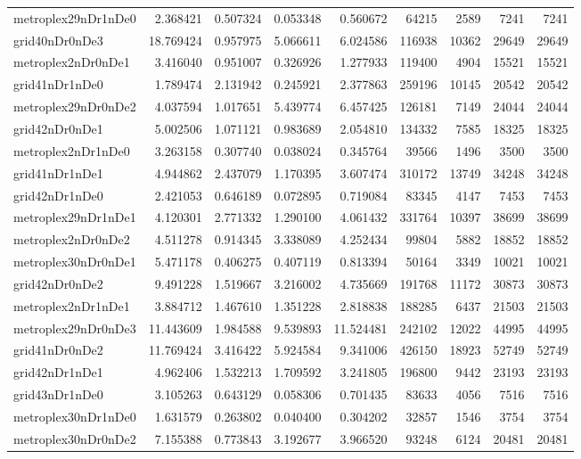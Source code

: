 \begin{longtable}{|l|r|r|r|r|r|r|r|r|}
metroplex29nDr1nDe0 & 2.368421 & 0.507324 & 0.053348 & 0.560672 & 64215 & 2589 & 7241 & 7241 \\
grid40nDr0nDe3 & 18.769424 & 0.957975 & 5.066611 & 6.024586 & 116938 & 10362 & 29649 & 29649 \\
metroplex2nDr0nDe1 & 3.416040 & 0.951007 & 0.326926 & 1.277933 & 119400 & 4904 & 15521 & 15521 \\
grid41nDr1nDe0 & 1.789474 & 2.131942 & 0.245921 & 2.377863 & 259196 & 10145 & 20542 & 20542 \\
metroplex29nDr0nDe2 & 4.037594 & 1.017651 & 5.439774 & 6.457425 & 126181 & 7149 & 24044 & 24044 \\
grid42nDr0nDe1 & 5.002506 & 1.071121 & 0.983689 & 2.054810 & 134332 & 7585 & 18325 & 18325 \\
metroplex2nDr1nDe0 & 3.263158 & 0.307740 & 0.038024 & 0.345764 & 39566 & 1496 & 3500 & 3500 \\
grid41nDr1nDe1 & 4.944862 & 2.437079 & 1.170395 & 3.607474 & 310172 & 13749 & 34248 & 34248 \\
grid42nDr1nDe0 & 2.421053 & 0.646189 & 0.072895 & 0.719084 & 83345 & 4147 & 7453 & 7453 \\
metroplex29nDr1nDe1 & 4.120301 & 2.771332 & 1.290100 & 4.061432 & 331764 & 10397 & 38699 & 38699 \\
metroplex2nDr0nDe2 & 4.511278 & 0.914345 & 3.338089 & 4.252434 & 99804 & 5882 & 18852 & 18852 \\
metroplex30nDr0nDe1 & 5.471178 & 0.406275 & 0.407119 & 0.813394 & 50164 & 3349 & 10021 & 10021 \\
grid42nDr0nDe2 & 9.491228 & 1.519667 & 3.216002 & 4.735669 & 191768 & 11172 & 30873 & 30873 \\
metroplex2nDr1nDe1 & 3.884712 & 1.467610 & 1.351228 & 2.818838 & 188285 & 6437 & 21503 & 21503 \\
metroplex29nDr0nDe3 & 11.443609 & 1.984588 & 9.539893 & 11.524481 & 242102 & 12022 & 44995 & 44995 \\
grid41nDr0nDe2 & 11.769424 & 3.416422 & 5.924584 & 9.341006 & 426150 & 18923 & 52749 & 52749 \\
grid42nDr1nDe1 & 4.962406 & 1.532213 & 1.709592 & 3.241805 & 196800 & 9442 & 23193 & 23193 \\
grid43nDr1nDe0 & 3.105263 & 0.643129 & 0.058306 & 0.701435 & 83633 & 4056 & 7516 & 7516 \\
metroplex30nDr1nDe0 & 1.631579 & 0.263802 & 0.040400 & 0.304202 & 32857 & 1546 & 3754 & 3754 \\
metroplex30nDr0nDe2 & 7.155388 & 0.773843 & 3.192677 & 3.966520 & 93248 & 6124 & 20481 & 20481 \\

\end{longtable}
